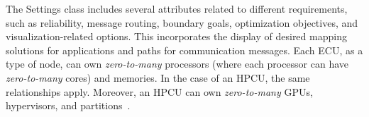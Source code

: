     The Settings class includes several attributes related to different requirements, such as reliability, message routing, boundary goals, optimization objectives, and visualization-related options. This incorporates the display of desired mapping solutions for applications and paths for communication messages.
    Each ECU, as a type of node, can own \textit{zero-to-many} processors (where each processor can have \textit{zero-to-many} cores) and memories. In the case of an HPCU, the same relationships apply. Moreover, an HPCU can own \textit{zero-to-many} GPUs, hypervisors, and partitions~\cite{9565115,askaripoor2023designer}.
    
    
    
    
    
    
    
